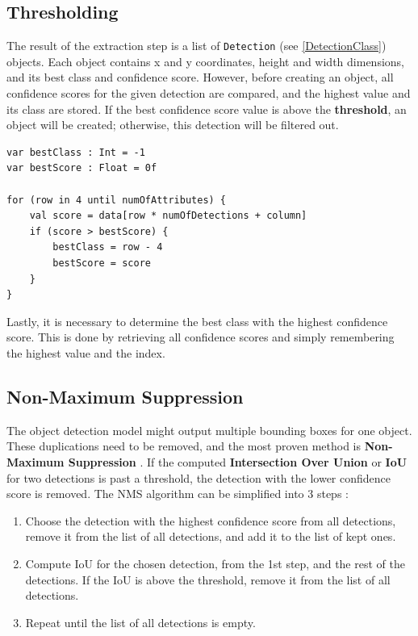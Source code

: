 \subsection{Thresholding}
The result of the extraction step is a list of \texttt{Detection} (see \ref{DetectionClass}) objects. Each object contains x and y coordinates, height and width dimensions, and its best class and confidence score. However, before creating an object, all confidence scores for the given detection are compared, and the highest value and its class are stored. If the best confidence score value is above the \textbf{threshold}, an object will be created; otherwise, this detection will be filtered out.

\begin{verbatim}
var bestClass : Int = -1
var bestScore : Float = 0f

for (row in 4 until numOfAttributes) {
    val score = data[row * numOfDetections + column]
    if (score > bestScore) {
        bestClass = row - 4
        bestScore = score
    }
}
\end{verbatim}

Lastly, it is necessary to determine the best class with the highest confidence score. This is done by retrieving all confidence scores and simply remembering the highest value and the index.


\subsection{Non-Maximum Suppression}
The object detection model might output multiple bounding boxes for one object. These duplications need to be removed, and the most proven method is \textbf{Non-Maximum Suppression} \cite{nms}. If the computed \textbf{Intersection Over Union} or \textbf{IoU} for two detections is past a threshold, the detection with the lower confidence score is removed. The NMS algorithm can be simplified into 3 steps \cite{nms}:

\begin{enumerate}
  \item {Choose the detection with the highest confidence score from all detections, remove it from the list of all detections, and add it to the list of kept ones.}
  
  \item {Compute IoU for the chosen detection, from the 1st step, and the rest of the detections. If the IoU is above the threshold, remove it from the list of all detections.}
  
  \item {Repeat until the list of all detections is empty.}
\end{enumerate}

